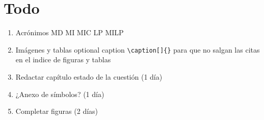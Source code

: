 \documentclass[final, 12pt, oneside]{class_diss}
\begin{document}
\section*{Todo}
\begin{enumerate}
  \item Acrónimos MD MI MIC LP MILP
  \item Imágenes y tablas optional caption \texttt{\textbackslash caption[]\{\}} para que no salgan las citas en el indice de figuras y tablas
  \item Redactar capítulo estado de la cuestión (1 día)
  \item ¿Anexo de símbolos? (1 día)
  \item Completar figuras (2 días)
\end{enumerate}

\setcounter{page}{-1}







\vfill

\newpage
{}
\setcounter{page}{1}

{}

\tableofcontents
\listoffigures
\listoftables

\newpage
{}
\setcounter{page}{1}





% 

% 


\nocite{*}



\appendix

\end{document}
